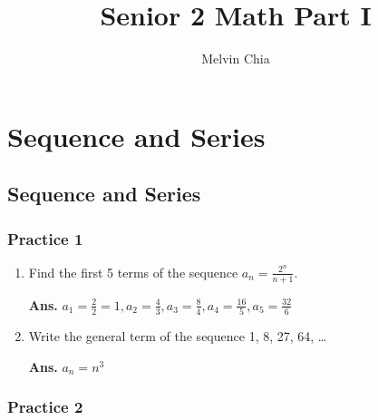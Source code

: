 \documentclass[a4paper]{report}
\title{Senior 2 Math Part I}
\author{Melvin Chia}
\begin{document}
	\maketitle


	\chapter{Sequence and Series}


	\section{Sequence and Series}


	\subsection{Practice 1}


	\begin{enumerate}
		\item Find the first 5 terms of the sequence $a_{n} = \frac{2^{n}}{n+1}$.

			\textbf{Ans.} $a_{1} = \frac{2}{2}= 1, a_{2} = \frac{4}{3}, a_{3} = \frac{8}{4}
			, a_{4} = \frac{16}{5}, a_{5} = \frac{32}{6}$

		\item Write the general term of the sequence 1, 8, 27, 64, \ldots

			\textbf{Ans.} $a_{n} = n^{3}$
	\end{enumerate}

	\subsection{Practice 2}
\end{document}
